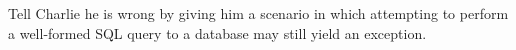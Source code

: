 \documentclass[exam,ans]{yqteach}
\begin{document}

\maketitle




\begin{markingsummary}
\end{markingsummary}

\pagebreak



 Tell Charlie he is wrong by giving him a scenario in which attempting to perform a well-formed SQL query to a database may still yield an exception.


\extraspace
{}


\endofdocument
\end{document}

